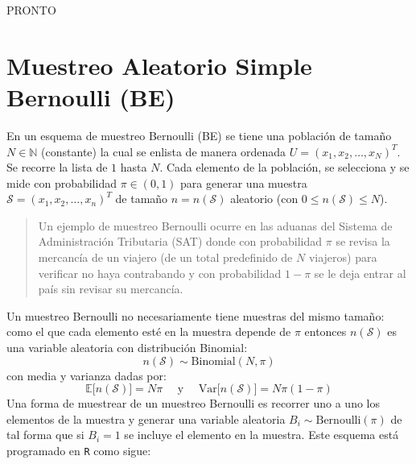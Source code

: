 \documentclass[
]{book}
\begin{document}
PRONTO

\hypertarget{muestreo-aleatorio-simple-bernoulli-be}{%
\section{Muestreo Aleatorio Simple Bernoulli (BE)}\label{muestreo-aleatorio-simple-bernoulli-be}}

En un esquema de muestreo Bernoulli (BE) se tiene una población de tamaño \(N\in\mathbb{N}\) (constante) la cual se enlista de manera ordenada \(U = (x_1,x_2,\dots,x_N)^T\). Se recorre la lista de \(1\) hasta \(N\). Cada elemento de la población, se selecciona y se mide con probabilidad \(\pi \in (0,1)\) para generar una muestra \(\mathcal{S} = (x_1, x_2, \dots, x_n)^T\) de tamaño \(n = n(\mathcal{S})\) aleatorio (con \(0 \leq n(\mathcal{S}) \leq N\)).

\begin{quote}
Un ejemplo de muestreo Bernoulli ocurre en las aduanas del Sistema de Administración Tributaria (SAT) donde con probabilidad \(\pi\) se revisa la mercancía de un viajero (de un total predefinido de \(N\) viajeros) para verificar no haya contrabando y con probabilidad \(1-\pi\) se le deja entrar al país sin revisar su mercancía.
\end{quote}

Un muestreo Bernoulli no necesariamente tiene muestras del mismo tamaño: como el que cada elemento esté en la muestra depende de \(\pi\) entonces \(n(\mathcal{S})\) es una variable aleatoria con distribución Binomial:
\[
n(\mathcal{S})\sim \textrm{Binomial}(N, \pi)
\]
con media y varianza dadas por:
\[
\mathbb{E}\Big[ n(\mathcal{S})\Big] = N\pi \quad \text{ y } \quad \text{Var}\Big[ n(\mathcal{S})\Big] = N\pi(1 - \pi)
\]
Una forma de muestrear de un muestreo Bernoulli es recorrer uno a uno los elementos de la muestra y generar una variable aleatoria \(B_i \sim \textrm{Bernoulli}(\pi)\) de tal forma que si \(B_i = 1\) se incluye el elemento en la muestra. Este esquema está programado en \texttt{R} como sigue:
\end{document}

